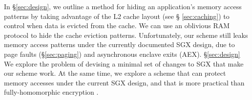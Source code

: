 In \S \ref{sec:design}, we outline a method for hiding an application's memory
access patterns by taking advantage of the L2 cache layout (see \S
\ref{sec:caching}) to control when data is evicted from the cache. We can use
an oblivious RAM protocol \cite{stefanov2013path} to hide the cache eviction
patterns. Unfortunately, our scheme still leaks memory access patterns under
the currently documented SGX design, due to page faults (\S \ref{sec:paging})
and asynchronous enclave exits (AEX). \S \ref{sec:design} We explore the
problem of devising a minimal set of changes to SGX that make our scheme work.
At the same time, we explore a scheme that can protect memory accesses under
the current SGX design, and that is more practical than fully-homomorphic
encryption \cite{gentry2009fhe} \cite{naehrig2011can}.
